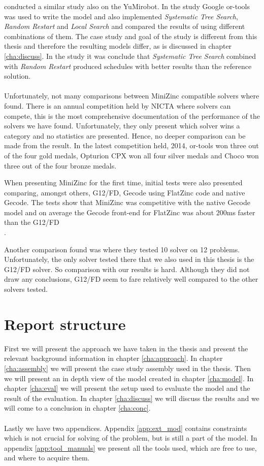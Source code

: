 \cite{ejenstam_2014} conducted a similar study also on the YuMi\textsuperscript\textregistered robot. In the study Google or-tools was used to write the model and also implemented \emph{Systematic Tree Search}, \emph{Random Restart} and \emph{Local Search} and compared the results of using different combinations of them. The case study and goal of the study is different from this thesis and therefore the resulting models differ, as is discussed in chapter \ref{cha:discuss}. In the study it was conclude that \emph{Systematic Tree Search} combined with \emph{Random Restart} produced schedules with better results than the reference solution.
\\\\
Unfortunately, not many comparisons between MiniZinc compatible solvers where found. There is an annual competition held by NICTA where solvers can compete, this is the most comprehensive documentation of the performance of the solvers we have found. Unfortunately, they only present which solver wins a category and no statistics are presented. Hence, no deeper comparison can be made from the result. In the latest competition held, 2014, or-tools won three out of the four gold medals, Opturion CPX won all four silver medals and Choco won three out of the four bronze medals\cite{mz_result_2014}.

When presenting MiniZinc for the first time, initial tests were also presented comparing, amongst others, G12/FD, Gecode using FlatZinc code and native Gecode. The tests show that MiniZinc was competitive with the native Gecode model and on average the Gecode front-end for FlatZinc was about 200ms faster than the G12/FD\\\cite{mz_paper}.

Another comparison found was \cite{nicta_2964} where they tested 10 solver on 12 problems. Unfortunately, the only solver tested there that we also used in this thesis is the G12/FD solver. So comparison with our results is hard. Although they did not draw any conclusions, G12/FD seem to fare relatively well compared to the other solvers tested.


\section{Report structure}
First we will present the approach we have taken in the thesis and present the relevant background information in chapter \ref{cha:approach}. In chapter \ref{cha:assembly} we will present the case study assembly used in the thesis. Then we will present an in depth view of the model created in chapter \ref{cha:model}.  In chapter \ref{cha:eval} we will present the setup used to evaluate the model and the result of the evaluation. In chapter \ref{cha:discuss} we will discuss the results and we will come to a conclusion in chapter \ref{cha:conc}.
\\\\
Lastly we have two appendices. Appendix \ref{app:ext_mod} contains constraints which is not crucial for solving of the problem, but is still a part of the model. In appendix \ref{app:tool_manuals} we present all the tools used, which are free to use, and where to acquire them.
